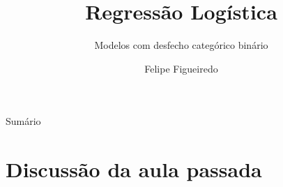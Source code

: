 \documentclass{beamer}
\title%
{Regressão Logística}
\subtitle
{Modelos com desfecho categórico binário} %
\author%
{Felipe Figueiredo}%
\institute[INTO] %
{Instituto Nacional de Traumatologia e Ortopedia
}
\date%
{}
\begin{document}
\begin{frame}
  \titlepage
\end{frame}

\begin{frame}{Sumário}
  \tableofcontents
\end{frame}








\section{Discussão da aula passada}
\end{document}
